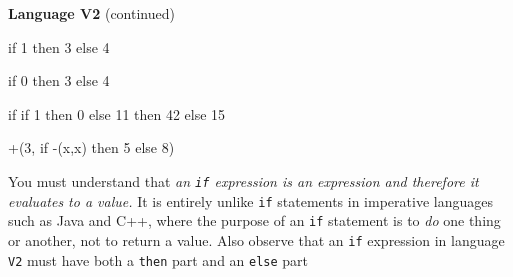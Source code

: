 \begin{minipage}[t]{\sw}
\slidenumber
\LARGE
{\bf Language V2} (continued)
\Large
\begin{qv}
if 1 then 3 else 4

if 0 then 3 else 4

if
  if 1 then 0 else 11
then
  42
else
  15

+(3, if -(x,x) then 5 else 8)
\end{qv}
\LARGE
You must understand that
{\em an \verb'if' expression is an expression
and therefore it evaluates to a value.}
It is entirely unlike \verb'if' statements
in imperative languages such as Java and C++,
where the purpose of an \verb'if' statement
is to {\em do} one thing or another, not to return a value.
Also observe that an \verb'if' expression in language \verb'V2'
must have both a \verb'then' part and an \verb'else' part
\end{minipage}
